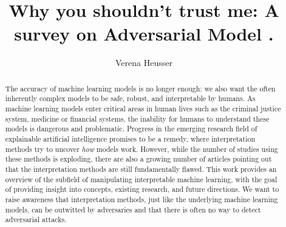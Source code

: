 \documentclass[sigconf]{acmart}
\begin{document}
\title{Why you shouldn't trust me: A survey on Adversarial Model .}

\author{Verena Heusser}


\begin{abstract}
  The accuracy of machine learning models is no longer enough: we also want the often inherently complex models to be safe, robust, and interpretable by humans. As machine learning models enter critical areas in human lives such as the criminal justice system, medicine or financial systems, the inability for humans to understand these models is dangerous and problematic. Progress in the emerging research field of explainable artificial intelligence promises to be a remedy, where interpretation methods try to uncover \textit{how} models work. However, while the number of studies using these methods is exploding, there are also a growing number of articles pointing out that the interpretation methods are still fundamentally flawed.   
  This work provides an overview of the subfield of manipulating interpretable machine learning, with the goal of providing insight into concepts, existing research, and future directions. We want to raise awareness that interpretation methods, just like the underlying machine learning models, can be outwitted by adversaries and that there is often no way to detect adversarial attacks.
  

\end{abstract}

\begin{CCSXML}
\end{CCSXML}
\end{document}
